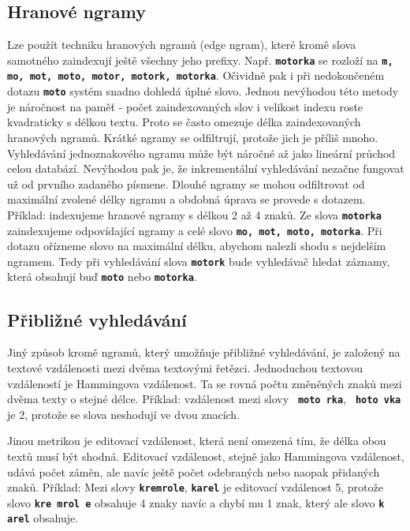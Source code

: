 \documentclass[12pt,letterpaper,oneside,openright]{book}
\newcommand{\bftt}[1]{\texttt{\textbf{#1}}}
\newcommand{\boldred}[1]{\textbf{\color{red} #1}}
\begin{document}
\subsection{Hranové ngramy} Lze použít techniku hranových ngramů
(edge ngram), které kromě slova samotného zaindexují ještě všechny jeho
prefixy. Např. \bftt{motorka} se rozloží na \bftt{m, mo, mot, moto,
motor, motork, motorka}. Očividně pak i při nedokončeném dotazu
\bftt{moto} systém snadno dohledá úplné slovo. Jednou nevýhodou této
metody je náročnost na paměť - počet zaindexovaných slov i velikost
indexu roste kvadraticky s délkou textu. Proto se často omezuje délka
zaindexovaných hranových ngramů. Krátké ngramy se odfiltrují, protože
jich je příliš mnoho.  Vyhledávání jednoznakového ngramu může být
náročné až jako lineární průchod celou databází. Nevýhodou pak je, že
inkrementální vyhledávání nezačne fungovat už od prvního zadaného
písmene. Dlouhé ngramy se mohou odfiltrovat od maximální zvolené délky
ngramu a obdobná úprava se provede s dotazem. Příklad: indexujeme
hranové ngramy s délkou 2 až 4 znaků. Ze slova \bftt{motorka}
zaindexujeme odpovídající ngramy a celé slovo \bftt{mo, mot, moto,
motorka}. Při dotazu ořízneme slovo na maximální délku, abychom nalezli
shodu s nejdelším ngramem.  Tedy při vyhledávání slova \bftt{motork}
bude vyhledávač hledat záznamy, která obsahují buď \bftt{moto} nebo
\bftt{motorka}.

\subsection{Přibližné vyhledávání}
Jiný způsob kromě ngramů, který umožňuje přibližné vyhledávání, je založený na
textové vzdálenosti mezi dvěma textovými řetězci. Jednoduchou textovou
vzdáleností je Hammingova vzdálenost. Ta se rovná počtu změněných znaků mezi
dvěma texty o stejné délce. Příklad: vzdálenost mezi slovy
\bftt{\boldred{m}oto\boldred{r}ka}, \bftt{\boldred{h}oto\boldred{v}ka} je 2,
protože se slova neshodují ve dvou znacích.

Jinou metrikou je editovací vzdálenost, která není omezená tím, že délka obou
textů musí být shodná. Editovací vzdálenost, stejně jako Hammingova vzdálenost,
udává počet záměn, ale navíc ještě počet odebraných nebo naopak přidaných
znaků. Příklad: Mezi slovy \bftt{kremrole}, \bftt{karel} je editovací
vzdálenost 5, protože slovo \bftt{kre\boldred{mro}l\boldred{e}} obsahuje 4 znaky navíc
a chybí mu 1 znak, který ale slovo \bftt{k\boldred{a}rel} obsahuje.
\end{document}
